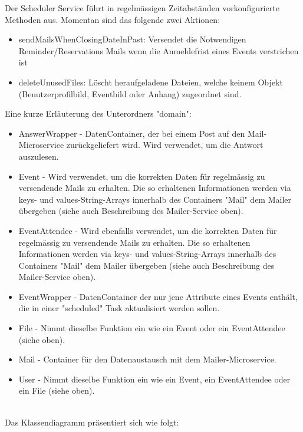 \documentclass[11pt]{article} %
\begin{document}
Der Scheduler Service führt in regelmässigen Zeitabständen vorkonfigurierte Methoden aus. Momentan sind das folgende zwei Aktionen:

\begin{itemize}
\item sendMailsWhenClosingDateInPast: Versendet die Notwendigen Reminder/Reservations Mails wenn die Anmeldefrist eines Events verstrichen ist
\item deleteUnusedFiles: Löscht heraufgeladene Dateien, welche keinem Objekt (Benutzerprofilbild, Eventbild oder Anhang) zugeordnet sind.
\end{itemize}

Eine kurze Erläuterung des Unterordners "domain":
\begin{itemize}
\item AnswerWrapper - DatenContainer, der bei einem Post auf den Mail-Microservice zurückgeliefert wird. Wird verwendet, um die Antwort auszulesen.
\item Event - Wird verwendet, um die korrekten Daten für regelmässig zu versendende Mails zu erhalten. Die so erhaltenen Informationen werden via keys- und values-String-Arrays innerhalb des Containers "Mail" dem Mailer übergeben (siehe auch Beschreibung des Mailer-Service oben).
\item EventAttendee - Wird ebenfalls verwendet, um die korrekten Daten für regelmässig zu versendende Mails zu erhalten. Die so erhaltenen Informationen werden via keys- und values-String-Arrays innerhalb des Containers "Mail" dem Mailer übergeben (siehe auch Beschreibung des Mailer-Service oben).
\item EventWrapper - DatenContainer der nur jene Attribute eines Events enthält, die in einer "scheduled" Task aktualisiert werden sollen.
\item File - Nimmt dieselbe Funktion ein wie ein Event oder ein EventAttendee (siehe oben).
\item Mail - Container für den Datenaustausch mit dem Mailer-Microservice.
\item User - Nimmt dieselbe Funktion ein wie ein Event, ein EventAttendee oder ein File (siehe oben).
\end{itemize}
\leavevmode \\
Das Klassendiagramm präsentiert sich wie folgt:
\\
\\
\end{document}
